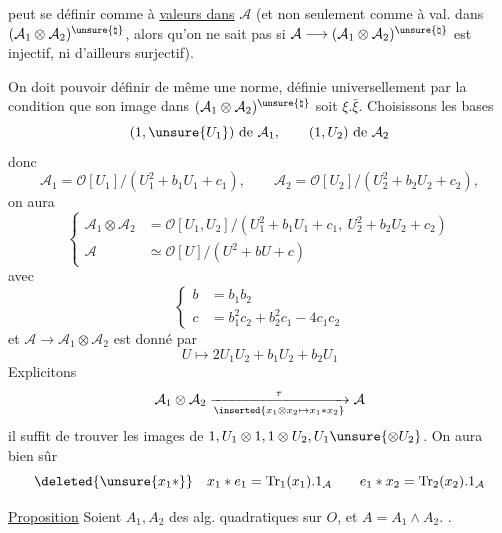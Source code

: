 peut se définir comme à \uline{valeurs dans} $\mathcal A$ (et non seulement comme à val. dans $(\mathcal A_1\otimes\mathcal A_2)^{\unsure{\natural}}$, alors qu'on ne sait pas si $\mathcal A\longrightarrow(\mathcal A_1\otimes\mathcal A_2)^{\unsure{\natural}}$ est  injectif, ni d'ailleurs surjectif).

On doit pouvoir définir de même une norme, définie universellement par la condition que son image dans $(\mathcal A_1\otimes\mathcal A_2)^{\unsure{\natural}}$ soit $\xi.\bar\xi$.
Choisissons les bases
\[
(1,\unsure{U_1})\text{ de }\mathcal A_1,\qquad (1,U_2)\text{ de }\mathcal A_2
\]
donc
\[
\mathcal A_1=\mathcal O[U_1]/(U_1^2+b_1U_1+c_1),\qquad
\mathcal A_2=\mathcal O[U_2]/(U_2^2+b_2U_2+c_2),
\]
on aura
\[
\left\{\begin{aligned}
\mathcal A_1\otimes\mathcal A_2&=\mathcal O[U_1,U_2]/(U_1^2+b_1U_1+c_1,\ U_2^2+b_2U_2+c_2)\\
\mathcal A&\simeq\mathcal O[U]/(U^2+bU+c)
\end{aligned}\right.
\]
avec
\[
\left\{\begin{aligned}
b&=b_1b_2\\
c&=b_1^2c_2+b_2^2c_1-4c_1c_2
\end{aligned}\right.
\]
et $\mathcal A\longrightarrow\mathcal A_1\otimes\mathcal A_2$ est donné par
\[
U\longmapsto2U_1U_2+b_1U_2+b_2U_1
\]
Explicitons
\[
\mathcal A_1\otimes\mathcal A_2\xrightarrow[\inserted{x_1\otimes x_2\mapsto x_1*x_2}]{\tau}\mathcal A
\]
il suffit de trouver les images de $1,U_1\otimes1,1\otimes U_2,U_1\unsure{\otimes U_2}$.
On aura bien sûr
\[
\deleted{\unsure{x_1*}}\quad x_1*e_1=\operatorname{Tr}_1(x_1).1_{\mathcal A}
\qquad e_1*x_2=\operatorname{Tr}_2(x_2).1_{\mathcal A}
\]

\uline{Proposition} Soient $A_1,A_2$ des alg. quadratiques sur $O$, et $A=A_1\wedge A_2$. .

